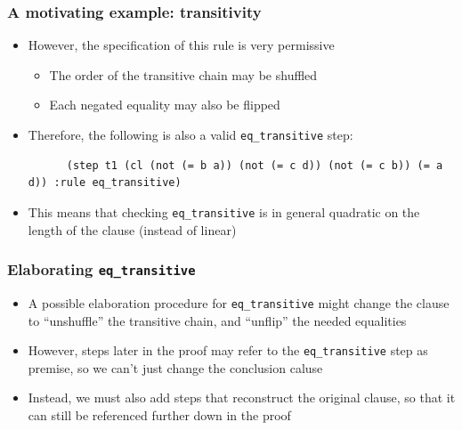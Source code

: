 \documentclass[usepdftitle=false,aspectratio=169]{beamer}
\newcommand\vitem{\vfill\item}
\begin{document}
\begin{frame}[fragile]
  \frametitle{A motivating example: transitivity}
  \begin{itemize}
    \item However, the specification of this rule is very permissive
    \begin{itemize}
      \item The order of the transitive chain may be shuffled
      \item Each negated equality may also be flipped
    \end{itemize}
    \vitem Therefore, the following is also a valid \texttt{eq\_transitive}
    step:
    \begin{verbatim}
      (step t1 (cl (not (= b a)) (not (= c d)) (not (= c b)) (= a d)) :rule eq_transitive)
    \end{verbatim}
    \vitem This means that checking \texttt{eq\_transitive} is in general quadratic on
    the length of the clause (instead of linear)
  \end{itemize}
\end{frame}

\begin{frame}
  \frametitle{Elaborating \texttt{eq\_transitive}}
  \begin{itemize}
    \item A possible elaboration procedure for \texttt{eq\_transitive} might
    change the clause to ``unshuffle'' the transitive chain, and ``unflip'' the
    needed equalities
    \vitem However, steps later in the proof may refer to the
    \texttt{eq\_transitive} step as premise, so we can't just change the
    conclusion caluse
    \vitem Instead, we must also add  steps that reconstruct the original
    clause, so that it can still be referenced further down in the proof
  \end{itemize}
\end{frame}
\end{document}
